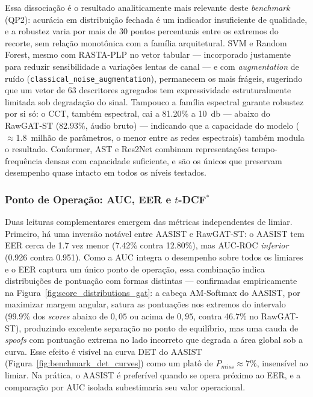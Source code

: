 \documentclass[12pt,a4paper]{article}
\begin{document}
Essa dissociação é o resultado analiticamente mais relevante deste
\textit{benchmark} (QP2): acurácia em distribuição fechada é um indicador
insuficiente de qualidade, e a robustez varia por mais de
\num{30} pontos percentuais entre os extremos do recorte, sem relação
monotônica com a família arquitetural. SVM e Random Forest, mesmo com
RASTA-PLP no vetor tabular --- incorporado
justamente para reduzir sensibilidade a variações lentas de canal --- e com
\textit{augmentation} de ruído (\texttt{classical\_noise\_augmentation}),
permanecem os mais frágeis, sugerindo que um vetor de \num{63} descritores
agregados tem expressividade estruturalmente limitada sob degradação do
sinal. Tampouco a família espectral garante robustez por si só: o CCT,
também espectral, cai a \num{81,20}\% a \SI{10}{\decibel} --- abaixo do
RawGAT-ST (\num{82,93}\%, áudio bruto) --- indicando que a capacidade do
modelo ($\approx$\num{1,8}~milhão de parâmetros, o menor entre as redes
espectrais) também modula o resultado. Conformer, AST e Res2Net combinam
representações tempo-frequência densas com capacidade suficiente, e são os
únicos que preservam desempenho quase intacto em todos os níveis testados.

\subsubsection*{Ponto de Operação: AUC, EER e $t$-DCF$^\ast$}

Duas leituras complementares emergem das métricas independentes de limiar.
Primeiro, há uma inversão notável entre AASIST e RawGAT-ST: o AASIST tem EER
cerca de \num{1,7} vez menor (\num{7,42}\% contra \num{12,80}\%), mas AUC-ROC
\textit{inferior} (\num{0,926} contra \num{0,951}). Como a AUC integra o
desempenho sobre todos os limiares e o EER captura um único ponto de operação,
essa combinação indica distribuições de pontuação com formas distintas ---
confirmadas empiricamente na Figura~\ref{fig:score_distributions_gat}: a
cabeça AM-Softmax do AASIST, por maximizar margem angular, satura as
pontuações nos extremos do intervalo (\num{99,9}\% dos \textit{scores} abaixo
de $0{,}05$ ou acima de $0{,}95$, contra \num{46,7}\% no RawGAT-ST),
produzindo excelente separação no ponto de equilíbrio, mas uma cauda de
\textit{spoofs} com pontuação extrema no lado incorreto que degrada a área
global sob a curva. Esse efeito é visível na curva DET do AASIST
(Figura~\ref{fig:benchmark_det_curves}) como um platô de
$P_{miss} \approx 7\%$, insensível ao limiar. Na prática, o AASIST é
preferível quando se opera próximo ao EER, e a comparação por AUC isolada
subestimaria seu valor operacional.
\end{document}
